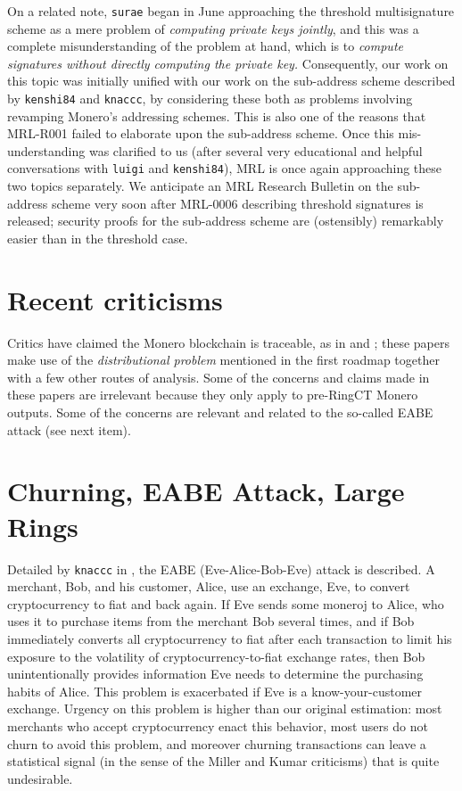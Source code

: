 \documentclass[12pt,english]{mrl}
\theoremstyle{definition}
\numberwithin{equation}{section}
\numberwithin{figure}{section}
\numberwithin{equation}{section}
\numberwithin{equation}{section}
\numberwithin{figure}{section}
\begin{document}
    
On a related note, \texttt{surae} began in June approaching the threshold multisignature scheme as a mere problem of \textit{computing private keys jointly}, and this was a complete misunderstanding of the problem at hand, which is to \textit{compute signatures without directly computing the private key.} Consequently, our work on this topic was initially unified with our work on the sub-address scheme described by \texttt{kenshi84} and \texttt{knaccc}, by considering these both as problems involving revamping Monero's addressing schemes. This is also one of the reasons that MRL-R001 failed to elaborate upon the sub-address scheme. Once this mis-understanding was clarified to us (after several very educational and helpful conversations with \texttt{luigi} and \texttt{kenshi84}), MRL is once again approaching these two topics separately. We anticipate an MRL Research Bulletin on the sub-address scheme very soon after MRL-0006 describing threshold signatures is released; security proofs for the sub-address scheme are (ostensibly) remarkably easier than in the threshold case.
    
\section{Recent criticisms} 

Critics have claimed the Monero blockchain is traceable, as in \cite{miller2017empirical} and \cite{kumar2017traceability}; these papers make use of the \emph{distributional problem} mentioned in the first roadmap together with a few other routes of analysis. Some of the concerns and claims made in these papers are irrelevant because they only apply to pre-RingCT Monero outputs. Some of the concerns are relevant and related to the so-called EABE attack (see next item).
    
    
    
\section{Churning, EABE Attack, Large Rings}

Detailed by \texttt{knaccc} in \cite{knaccc2017}, the EABE (Eve-Alice-Bob-Eve) attack is described. A merchant, Bob, and his customer, Alice, use an exchange, Eve, to convert cryptocurrency to fiat and back again. If Eve sends some moneroj to Alice, who uses it to purchase items from the merchant Bob several times, and if Bob immediately converts all cryptocurrency to fiat after each transaction to limit his exposure to the volatility of cryptocurrency-to-fiat exchange rates, then Bob unintentionally provides information Eve needs to determine the purchasing habits of Alice. This problem is exacerbated if Eve is a know-your-customer exchange. Urgency on this problem is higher than our original estimation: most merchants who accept cryptocurrency enact this behavior, most users do not churn to avoid this problem, and moreover churning transactions can leave a statistical signal (in the sense of the Miller and Kumar criticisms) that is quite undesirable.  
    
\end{document}
